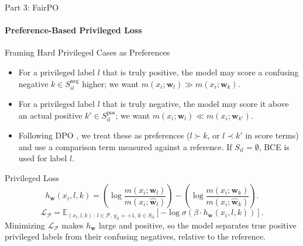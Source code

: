 \documentclass[aspectratio=169]{beamer}
\newcommand{\E}{\mathbb{E}}
\newcommand{\privileged}{\mathcal{P}} %
\newcommand{\confusing}{S_{il}} %
\newcommand{\model}{m} %
\newcommand{\params}{\mathbf{w}} %
\newcommand{\refparams}{\hat{\mathbf{w}}} %
\newcommand{\loss}{\mathcal{L}}
\begin{document}
	\begin{frame}{Part 3: FairPO}
		\framesubtitle{Preference-Based Privileged Loss}
		\begin{block}{\scriptsize Framing Hard Privileged Cases as Preferences}\scriptsize
			\begin{itemize}
				\item For a privileged label $l$ that is truly positive, the model may score a confusing negative $k \in S_{il}^{\text{neg}}$ higher; we want $\model(x_i; \params_l) \gg \model(x_i; \params_k)$.
				\item For a privileged label $l$ that is truly negative, the model may score it above an actual positive $k' \in S_{il}^{\text{pos}}$; we want $\model(x_i; \params_l) \ll \model(x_i; \params_{k'})$.
				\item Following DPO \autocite{rafailov2023direct}, we treat these as preferences ($l \succ k$, or $l \prec k'$ in score terms) and use a comparison term measured against a reference. If $S_{il} = \emptyset$, BCE is used for label $l$.
			\end{itemize}
		\end{block}
		\begin{block}{\scriptsize Privileged Loss}\scriptsize
			\begin{equation}
				h_{\params}(x_i, l, k) = \left( \log \frac{\model(x_i; \params_l)}{\model(x_i; \refparams_l)} \right) - \left( \log \frac{\model(x_i; \params_k)}{\model(x_i; \refparams_k)} \right).
			\end{equation}
			\begin{equation}
				\loss_{\privileged} = \E_{(x_i, l, k)\,:\, l \in \privileged,\, y_{il}=+1,\, k \in \confusing} \left[ -\log \sigma \left( \beta \cdot h_{\params}(x_i, l, k) \right) \right].
			\end{equation}
			Minimizing $\loss_{\privileged}$ makes $h_{\params}$ large and positive, so the model separates true positive privileged labels from their confusing negatives, relative to the reference.
		\end{block}
	\end{frame}
	
\end{document}

